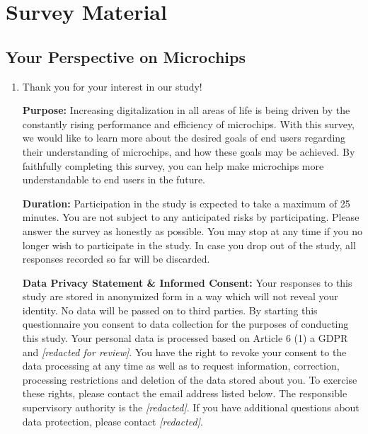 \section{Survey Material}
\label{xhw_study::app::survey}

\subsection{Your Perspective on Microchips}
\label{xhw_study::subapp::informed}
\begin{enumerate}
    \item \label{xhw_study::question::consent}
        Thank you for your interest in our study!
          
        \textbf{Purpose:} Increasing digitalization in all areas of life is being driven by the constantly rising performance and efficiency of microchips. With this survey, we would like to learn more about the desired goals of end users regarding their understanding of microchips, and how these goals may be achieved. By faithfully completing this survey, you can help make microchips more understandable to end users in the future.
        
        \textbf{Duration:} Participation in the study is expected to take a maximum of 25 minutes. You are not subject to any anticipated risks by participating. Please answer the survey as honestly as possible. You may stop at any time if you no longer wish to participate in the study. In case you drop out of the study, all responses recorded so far will be discarded.
          
        \textbf{Data Privacy Statement \& Informed Consent:} 
        Your responses to this study are stored in anonymized form in a way which will not reveal your identity. 
        No data will be passed on to third parties. 
        By starting this questionnaire you consent to data collection for the purposes of conducting this study. 
        Your personal data is processed based on Article 6 (1) a GDPR and \textit{[redacted for review]}. %
        You have the right to revoke your consent to the data processing at any time as well as to request information, correction, processing restrictions and deletion of the data stored about you. 
        To exercise these rights, please contact the email address listed below. 
        The responsible supervisory authority is the \textit{[redacted]}. %
        If you have additional questions about data protection, please contact \textit{[redacted]}. %
        

\end{enumerate}
